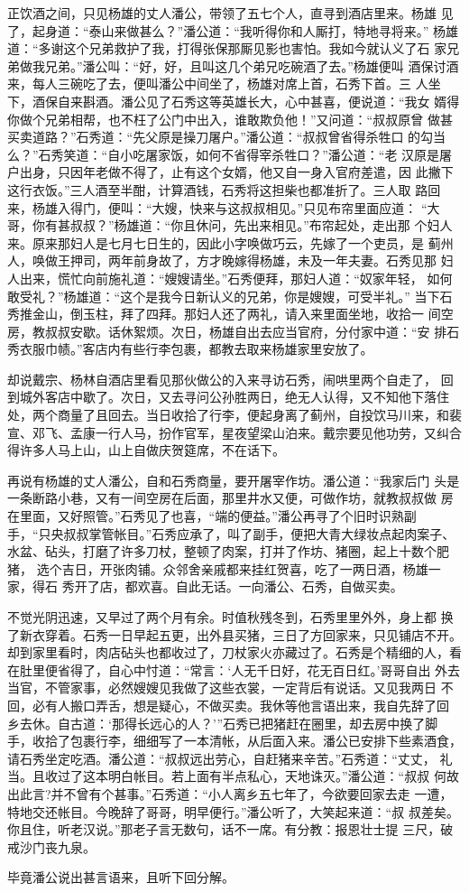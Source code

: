 正饮酒之间，只见杨雄的丈人潘公，带领了五七个人，直寻到酒店里来。杨雄
见了，起身道：“泰山来做甚么？”潘公道：“我听得你和人厮打，特地寻将来。”
杨雄道：“多谢这个兄弟救护了我，打得张保那厮见影也害怕。我如今就认义了石
家兄弟做我兄弟。”潘公叫：“好，好，且叫这几个弟兄吃碗酒了去。”杨雄便叫
酒保讨酒来，每人三碗吃了去，便叫潘公中间坐了，杨雄对席上首，石秀下首。三
人坐下，酒保自来斟酒。潘公见了石秀这等英雄长大，心中甚喜，便说道：“我女
婿得你做个兄弟相帮，也不枉了公门中出入，谁敢欺负他！”又问道：“叔叔原曾
做甚买卖道路？”石秀道：“先父原是操刀屠户。”潘公道：“叔叔曾省得杀牲口
的勾当么？”石秀笑道：“自小吃屠家饭，如何不省得宰杀牲口？”潘公道：“老
汉原是屠户出身，只因年老做不得了，止有这个女婿，他又自一身入官府差遣，因
此撇下这行衣饭。”三人酒至半酣，计算酒钱，石秀将这担柴也都准折了。三人取
路回来，杨雄入得门，便叫：“大嫂，快来与这叔叔相见。”只见布帘里面应道：
“大哥，你有甚叔叔？”杨雄道：“你且休问，先出来相见。”布帘起处，走出那
个妇人来。原来那妇人是七月七日生的，因此小字唤做巧云，先嫁了一个吏员，是
蓟州人，唤做王押司，两年前身故了，方才晚嫁得杨雄，未及一年夫妻。石秀见那
妇人出来，慌忙向前施礼道：“嫂嫂请坐。”石秀便拜，那妇人道：“奴家年轻，
如何敢受礼？”杨雄道：“这个是我今日新认义的兄弟，你是嫂嫂，可受半礼。”
当下石秀推金山，倒玉柱，拜了四拜。那妇人还了两礼，请入来里面坐地，收拾一
间空房，教叔叔安歇。话休絮烦。次日，杨雄自出去应当官府，分付家中道：“安
排石秀衣服巾帻。”客店内有些行李包裹，都教去取来杨雄家里安放了。

却说戴宗、杨林自酒店里看见那伙做公的入来寻访石秀，闹哄里两个自走了，
回到城外客店中歇了。次日，又去寻问公孙胜两日，绝无人认得，又不知他下落住
处，两个商量了且回去。当日收拾了行李，便起身离了蓟州，自投饮马川来，和裴
宣、邓飞、孟康一行人马，扮作官军，星夜望梁山泊来。戴宗要见他功劳，又纠合
得许多人马上山，山上自做庆贺筵席，不在话下。

再说有杨雄的丈人潘公，自和石秀商量，要开屠宰作坊。潘公道：“我家后门
头是一条断路小巷，又有一间空房在后面，那里井水又便，可做作坊，就教叔叔做
房在里面，又好照管。”石秀见了也喜，“端的便益。”潘公再寻了个旧时识熟副
手，“只央叔叔掌管帐目。”石秀应承了，叫了副手，便把大青大绿妆点起肉案子、
水盆、砧头，打磨了许多刀杖，整顿了肉案，打并了作坊、猪圈，起上十数个肥猪，
选个吉日，开张肉铺。众邻舍亲戚都来挂红贺喜，吃了一两日酒，杨雄一家，得石
秀开了店，都欢喜。自此无话。一向潘公、石秀，自做买卖。

不觉光阴迅速，又早过了两个月有余。时值秋残冬到，石秀里里外外，身上都
换了新衣穿着。石秀一日早起五更，出外县买猪，三日了方回家来，只见铺店不开。
却到家里看时，肉店砧头也都收过了，刀杖家火亦藏过了。石秀是个精细的人，看
在肚里便省得了，自心中忖道：“常言：‘人无千日好，花无百日红。’哥哥自出
外去当官，不管家事，必然嫂嫂见我做了这些衣裳，一定背后有说话。又见我两日
不回，必有人搬口弄舌，想是疑心，不做买卖。我休等他言语出来，我自先辞了回
乡去休。自古道：‘那得长远心的人？’”石秀已把猪赶在圈里，却去房中换了脚
手，收拾了包裹行李，细细写了一本清帐，从后面入来。潘公已安排下些素酒食，
请石秀坐定吃酒。潘公道：“叔叔远出劳心，自赶猪来辛苦。”石秀道：“丈丈，
礼当。且收过了这本明白帐目。若上面有半点私心，天地诛灭。”潘公道：“叔叔
何故出此言?并不曾有个甚事。”石秀道：“小人离乡五七年了，今欲要回家去走
一遭，特地交还帐目。今晚辞了哥哥，明早便行。”潘公听了，大笑起来道：“叔
叔差矣。你且住，听老汉说。”那老子言无数句，话不一席。有分教：报恩壮士提
三尺，破戒沙门丧九泉。

毕竟潘公说出甚言语来，且听下回分解。